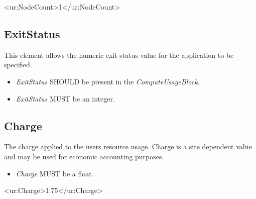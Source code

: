 \begin{XMLexample}
<ur:NodeCount>1</ur:NodeCount>
\end{XMLexample}




\subsection{ExitStatus}

This element allows the numeric exit status value for the application to be specified.
\begin{itemize}
\item \emph{ExitStatus} SHOULD be present in the \emph{ComputeUsageBlock}.
\item \emph{ExitStatus} MUST be an integer.
\end{itemize}



\subsection{Charge} \label{ComputeCharge}

The charge applied to the users resource usage. Charge is a site dependent value and may be used for economic accounting purposes.

\begin{itemize}
\item \emph{Charge} MUST be a float.
\end{itemize}

\begin{XMLexample}
<ur:Charge>1.75</ur:Charge>
\end{XMLexample}
